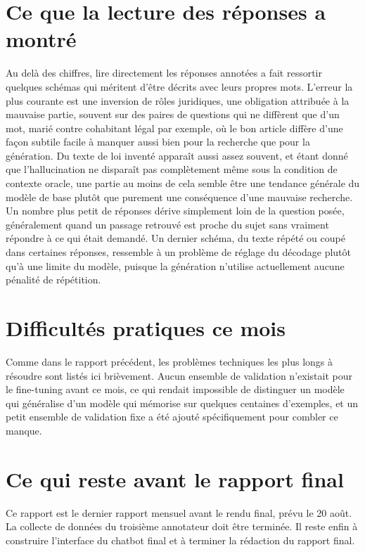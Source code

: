 \documentclass[11pt, a4paper]{article}
\begin{document}
\section{Ce que la lecture des r\'eponses a montr\'e}

Au del\`a des chiffres, lire directement les r\'eponses annot\'ees a fait ressortir quelques sch\'emas qui m\'eritent d'\^etre d\'ecrits avec leurs propres mots. L'erreur la plus courante est une inversion de r\^oles juridiques, une obligation attribu\'ee \`a la mauvaise partie, souvent sur des paires de questions qui ne diff\`erent que d'un mot, mari\'e contre cohabitant l\'egal par exemple, o\`u le bon article diff\`ere d'une fa\c{c}on subtile facile \`a manquer aussi bien pour la recherche que pour la g\'en\'eration. Du texte de loi invent\'e appara\^it aussi assez souvent, et \'etant donn\'e que l'hallucination ne dispara\^it pas compl\`etement m\^eme sous la condition de contexte oracle, une partie au moins de cela semble \^etre une tendance g\'en\'erale du mod\`ele de base plut\^ot que purement une cons\'equence d'une mauvaise recherche. Un nombre plus petit de r\'eponses d\'erive simplement loin de la question pos\'ee, g\'en\'eralement quand un passage retrouv\'e est proche du sujet sans vraiment r\'epondre \`a ce qui \'etait demand\'e. Un dernier sch\'ema, du texte r\'ep\'et\'e ou coup\'e dans certaines r\'eponses, ressemble \`a un probl\`eme de r\'eglage du d\'ecodage plut\^ot qu'\`a une limite du mod\`ele, puisque la g\'en\'eration n'utilise actuellement aucune p\'enalit\'e de r\'ep\'etition.

\section{Difficult\'es pratiques ce mois}

Comme dans le rapport pr\'ec\'edent, les probl\`emes techniques les plus longs \`a r\'esoudre sont list\'es ici bri\`evement. Aucun ensemble de validation n'existait pour le fine-tuning avant ce mois, ce qui rendait impossible de distinguer un mod\`ele qui g\'en\'eralise d'un mod\`ele qui m\'emorise sur quelques centaines d'exemples, et un petit ensemble de validation fixe a \'et\'e ajout\'e sp\'ecifiquement pour combler ce manque.

\section{Ce qui reste avant le rapport final}

Ce rapport est le dernier rapport mensuel avant le rendu final, pr\'evu le 20 ao\^ut. La collecte de donn\'ees du troisi\`eme annotateur doit \^etre termin\'ee. Il reste enfin \`a construire l'interface du chatbot final et \`a terminer la r\'edaction du rapport final.
\end{document}
